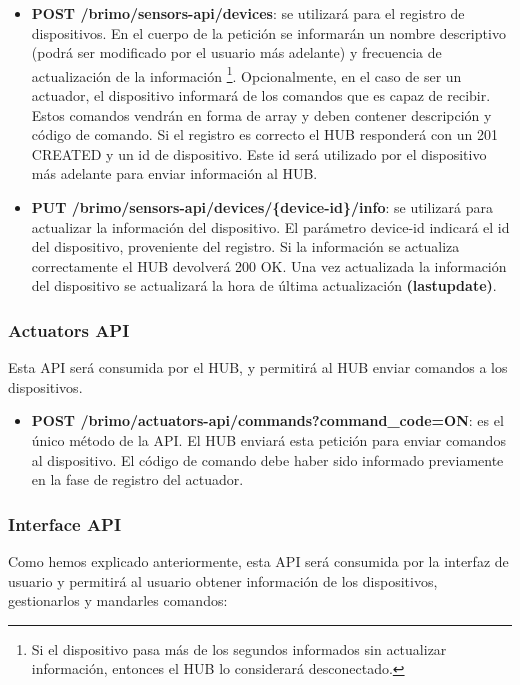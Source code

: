 \begin{itemize}
\setlength\itemsep{6pt plus 1pt minus 1pt}
\item \textbf{POST /brimo/sensors-api/devices}: se utilizará para el registro de dispositivos. En el cuerpo de la petición se informarán
 un nombre descriptivo (podrá ser modificado por el usuario más adelante) y frecuencia
de actualización de la información \footnote{ Si el dispositivo pasa más de los segundos informados sin actualizar información, entonces
el HUB lo considerará desconectado.}. Opcionalmente, en el caso de ser un actuador, el dispositivo informará de los comandos que es capaz
de recibir. Estos comandos vendrán en forma de array y deben contener descripción y código de comando.
Si el registro es correcto el HUB responderá con un 201 CREATED y un id de dispositivo. Este id será utilizado por el dispositivo más adelante
para enviar información al HUB.
\item \textbf{PUT /brimo/sensors-api/devices/\{device-id\}/info}: se utilizará para actualizar la información del dispositivo. El parámetro
device-id indicará el id del dispositivo, proveniente del registro. Si la información se actualiza correctamente el HUB devolverá 200 OK. Una vez
actualizada la información del dispositivo se actualizará la hora de última actualización \textbf{(lastupdate)}.
\end{itemize}

\subsubsection{Actuators API}
Esta API será consumida por el HUB, y permitirá al HUB enviar comandos a los dispositivos.

\begin{itemize}
\setlength\itemsep{6pt plus 1pt minus 1pt}

\item \textbf{POST /brimo/actuators-api/commands?command\_code=ON}: es el único método de la API. El HUB enviará esta petición para enviar
comandos al dispositivo. El código de comando debe haber sido informado previamente en la fase de registro del actuador.

\end{itemize}

\subsubsection{Interface API}
Como hemos explicado anteriormente, esta API será consumida por la interfaz de usuario y permitirá al usuario obtener información de los dispositivos,
gestionarlos y mandarles comandos:

